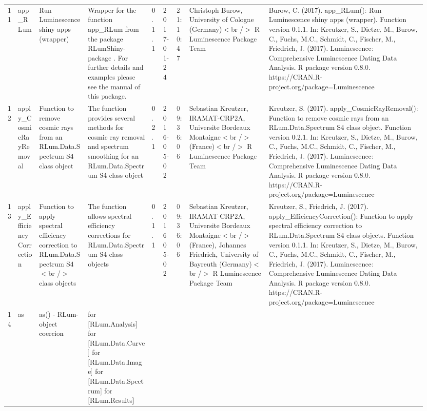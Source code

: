 \begin{table}[ht]
\begin{tabular}{rllllllll}
 \\ 
  11 & app\_RLum & Run Luminescence shiny apps (wrapper) & Wrapper for the function  app\_RLum  from the package RLumShiny-package . For further details and examples please see the manual of this package. & 0.1.1 & 2017-01-24 & 21:10:47
 & Christoph Burow, University of Cologne (Germany)$<$br /$>$  R Luminescence Package Team & Burow, C. (2017). app\_RLum(): Run Luminescence shiny apps (wrapper). Function version 0.1.1. In: Kreutzer, S., Dietze, M., Burow, C., Fuchs, M.C., Schmidt, C., Fischer, M., Friedrich, J. (2017). Luminescence: Comprehensive Luminescence Dating Data Analysis. R package version 0.8.0. https://CRAN.R-project.org/package=Luminescence
 \\ 
  12 & apply\_CosmicRayRemoval & Function to remove cosmic rays from an RLum.Data.Spectrum S4 class object & The function provides several methods for cosmic ray removal and spectrum smoothing for an RLum.Data.Spectrum S4 class object & 0.2.1 & 2016-05-02 & 09:36:06
 & Sebastian Kreutzer, IRAMAT-CRP2A, Universite Bordeaux Montaigne$<$br /$>$ (France)$<$br /$>$  R Luminescence Package Team & Kreutzer, S. (2017). apply\_CosmicRayRemoval(): Function to remove cosmic rays from an RLum.Data.Spectrum S4 class object. Function version 0.2.1. In: Kreutzer, S., Dietze, M., Burow, C., Fuchs, M.C., Schmidt, C., Fischer, M., Friedrich, J. (2017). Luminescence: Comprehensive Luminescence Dating Data Analysis. R package version 0.8.0. https://CRAN.R-project.org/package=Luminescence
 \\ 
  13 & apply\_EfficiencyCorrection & Function to apply spectral efficiency correction to RLum.Data.Spectrum S4$<$br /$>$ class objects & The function allows spectral efficiency corrections for RLum.Data.Spectrum S4 class objects & 0.1.1 & 2016-05-02 & 09:36:06
 & Sebastian Kreutzer, IRAMAT-CRP2A, Universite Bordeaux Montaigne$<$br /$>$ (France),  Johannes Friedrich, University of Bayreuth (Germany)$<$br /$>$  R Luminescence Package Team & Kreutzer, S., Friedrich, J. (2017). apply\_EfficiencyCorrection(): Function to apply spectral efficiency correction to RLum.Data.Spectrum S4 class objects. Function version 0.1.1. In: Kreutzer, S., Dietze, M., Burow, C., Fuchs, M.C., Schmidt, C., Fischer, M., Friedrich, J. (2017). Luminescence: Comprehensive Luminescence Dating Data Analysis. R package version 0.8.0. https://CRAN.R-project.org/package=Luminescence
 \\ 
  14 & as & as() - RLum-object coercion & for  [RLum.Analysis]   for  [RLum.Data.Curve]   for  [RLum.Data.Image]   for  [RLum.Data.Spectrum]   for  [RLum.Results] &  &  &  &  &  \\ 

\end{tabular}
\end{table}
